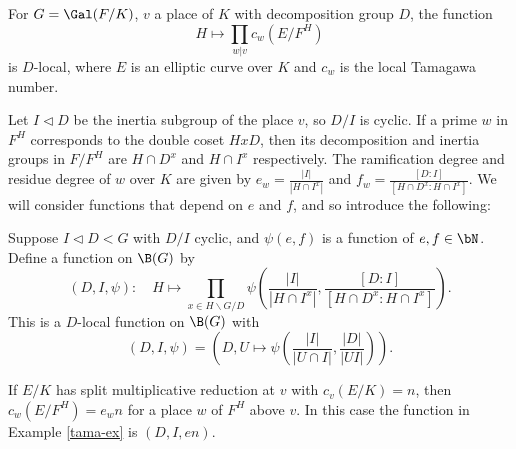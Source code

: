 \begin{example}\label{tama-ex}
    For $G = \Gal(F / K)$, $v$ a place of $K$ with decomposition group $D$, the function
    \[ H \mapsto \prod_{w | v} c_w(E / F^{H}) \]
    is $D$-local, where $E$ is an elliptic curve over $K$ and $c_w$ is the local Tamagawa number. 
\end{example}

Let $I \triangleleft D$ be the inertia subgroup of the place $v$, so $D / I$ is cyclic. If a prime $w$ in $F^H$ corresponds to the double coset $HxD$, then its decomposition and inertia groups in $F / F^H$ are $H \cap D^x$ and $H \cap I^x$ respectively.
The ramification degree and residue degree of $w$ over $K$ are given by $e_w = \frac{|I|}{|H \cap I^x|}$ and $f_w = \frac{[D : I]}{[H \cap D^x : H \cap I^x]}$. We will consider functions that depend on $e$ and $f$, and so introduce the following:

\begin{defn}\cite[Definition 2.35]{reg-const}\label{D-I-fn}
    Suppose $I \triangleleft D < G$ with $D / I$ cyclic, and $\psi(e,f)$ is a function of $e, f \in \bN$. Define a function on $\B(G)$ by 
    \[ \left(D, I, \psi\right) \colon \quad H \mapsto \prod_{x \in H\backslash G / D} \psi\left(\frac{|I|}{|H \cap I^x|}, \frac{[D : I]}{[H \cap D^x : H \cap I^x]}\right). \]
    This is a $D$-local function on $\B(G)$ with
    \[ (D, I, \psi) = \left(D, U \mapsto \psi\left(\frac{|I|}{|U \cap I|}, \frac{|D|}{|UI|}\right)\right). \]
\end{defn}

\begin{example}
    If $E / K$ has split multiplicative reduction at $v$ with $c_v(E / K) = n$, then $c_w(E / F^H) = e_w n$ for a place $w$ of $F^H$ above $v$. In this case the function in Example \ref{tama-ex} is $(D, I, e n)$. 
\end{example}



